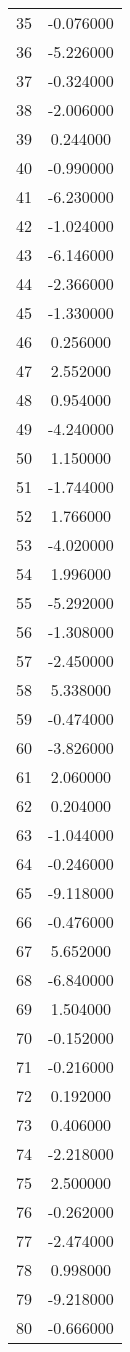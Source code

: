 \documentclass[12pt]{article}
\begin{document}
\begin{longtable}{@{}cc@{}}
35 & -0.076000 \\
36 & -5.226000 \\
37 & -0.324000 \\
38 & -2.006000 \\
39 & 0.244000 \\
40 & -0.990000 \\
41 & -6.230000 \\
42 & -1.024000 \\
43 & -6.146000 \\
44 & -2.366000 \\
45 & -1.330000 \\
46 & 0.256000 \\
47 & 2.552000 \\
48 & 0.954000 \\
49 & -4.240000 \\
50 & 1.150000 \\
51 & -1.744000 \\
52 & 1.766000 \\
53 & -4.020000 \\
54 & 1.996000 \\
55 & -5.292000 \\
56 & -1.308000 \\
57 & -2.450000 \\
58 & 5.338000 \\
59 & -0.474000 \\
60 & -3.826000 \\
61 & 2.060000 \\
62 & 0.204000 \\
63 & -1.044000 \\
64 & -0.246000 \\
65 & -9.118000 \\
66 & -0.476000 \\
67 & 5.652000 \\
68 & -6.840000 \\
69 & 1.504000 \\
70 & -0.152000 \\
71 & -0.216000 \\
72 & 0.192000 \\
73 & 0.406000 \\
74 & -2.218000 \\
75 & 2.500000 \\
76 & -0.262000 \\
77 & -2.474000 \\
78 & 0.998000 \\
79 & -9.218000 \\
80 & -0.666000 \\

\end{longtable}
\end{document}

